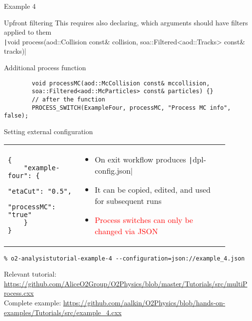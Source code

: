 \documentclass[10pt,lualatex,xcolor={table,svgnames},{hyperref={bookmarks=true,linktoc=all}},aspectratio=169]{beamer}
\newcommand{\codelines}[2]{{\texttt|#1|}}
\newcommand{\codeline}[1]{{\texttt|#1|}}
\begin{document}
\begin{frame}{Example 4}
\begin{block}{Upfront filtering}
This requires also declaring, which arguments should have filters applied to them \\
\codelines{void process(aod::Collision const& collision, soa::Filtered<aod::Tracks> const& tracks)}{\footnotesize}
\vspace{0.2ex}
\end{block}
\begin{block}{Additional process function}
    \begin{verbatim}
        void processMC(aod::McCollision const& mccollision,
        soa::Filtered<aod::McParticles> const& particles) {}
        // after the function
        PROCESS_SWITCH(ExampleFour, processMC, "Process MC info", false);
    \end{verbatim}
\end{block}
\framebreak
\begin{block}{Setting external configuration}
\begin{tabular}{p{0.3\linewidth}p{0.6\linewidth}}
{\begin{verbatim}
{
    "example-four": {
        "etaCut": "0.5",
        "processMC": "true"
    }
}
\end{verbatim}
} &
{\begin{itemize}
    \item On exit workflow produces \codeline{dpl-config.json}
    \item It can be copied, edited, and used for subsequent runs
    \item \textcolor{red}{Process switches can only be changed via JSON}
\end{itemize}
} \\
\end{tabular}

\begin{verbatim}
% o2-analysistutorial-example-4 --configuration=json://example_4.json
\end{verbatim}
\end{block}
{\footnotesize Relevant tutorial:  \href{https://github.com/AliceO2Group/O2Physics/blob/master/Tutorials/src/multiProcess.cxx}{https://github.com/AliceO2Group/O2Physics/blob/master/Tutorials/src/multiProcess.cxx} \\
    Complete example: \href{https://github.com/aalkin/O2Physics/blob/hands-on-examples/Tutorials/src/example_4.cxx}{https://github.com/aalkin/O2Physics/blob/hands-on-examples/Tutorials/src/example\_4.cxx}
}
\end{frame}
\end{document}
